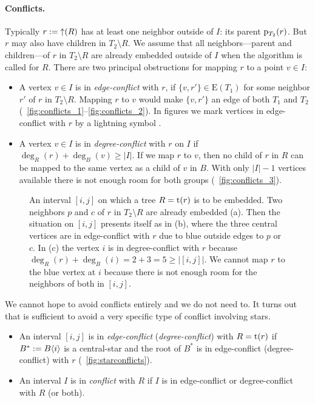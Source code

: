 \documentclass[11pt,a4paper,colorlinks=true,urlcolor=blue,citecolor=red]{article}
\theoremstyle{plain}
\newcommand{\subsubparagraph}[1]{\paragraph{#1}}
\begin{document}
\subsubparagraph{Conflicts.} Typically $r:=\mathop{\uparrow}(R)$ has at least one
neighbor outside of $I$: its parent $\mathrm p_{T_2}(r)$. But $r$ may also have
children in $T_2\setminus R$. We assume that all neighbors---parent and
children---of $r$ in $T_2\setminus R$ are already embedded outside of
$I$ when the algorithm is called for $R$. There are two principal
obstructions for mapping $r$ to a point $v\in I$:
\begin{itemize}
\item A vertex $v\in I$ is in \emph{edge-conflict} with $r$, if
  $\{v,r'\}\in\mathrm{E}(T_1)$ for some neighbor $r'$ of $r$ in
  $T_2\setminus R$. Mapping $r$ to $v$ would make $\{v,r'\}$ an edge of
  both $T_1$ and $T_2$
  (\figurename~\ref{fig:conflicts_1}--\ref{fig:conflicts_2}). In figures
  we mark vertices in edge-conflict with $r$ by a lightning symbol
  \Lightning.
\item A vertex $v\in I$ is in \emph{degree-conflict} with $r$ on $I$ if
  $\deg_R(r)+\deg_B(v)\ge|I|$. If we map $r$ to $v$, then no child of
  $r$ in $R$ can be mapped to the same vertex as a child of $v$ in
  $B$. With only $|I|-1$ vertices available there is not enough room for
  both groups (\figurename~\ref{fig:conflicts_3}).
\end{itemize}
\begin{figure}[htbp]
  \centering {}\hfil
  \hfil
  \hfil
  \caption{An interval $[i,j]$ on which a tree $R=\mathrm t(r)$ is to be
    embedded. Two neighbors $p$ and $c$ of $r$ in $T_2\setminus R$ are
    already embedded (a). Then the situation on $[i,j]$ presents itself
    as in (b), where the three central vertices are in edge-conflict
    with $r$ due to blue outside edges to $p$ or $c$.  In (c) the vertex
    $i$ is in degree-conflict with $r$ because
    $\deg_R(r)+\deg_B(i)=2+3=5\ge|[i,j]|$. We cannot map $r$ to the blue
    vertex at $i$ because there is not enough room for the neighbors of
    both in $[i,j]$.\label{fig:conflicts}}
\end{figure}

We cannot hope to avoid conflicts entirely and we do not need to. It
turns out that is sufficient to avoid a very specific type of conflict
involving stars.
\begin{itemize}
\item An interval $[i,j]$ is in \emph{edge-conflict}
  (\emph{degree-conflict}) with $R=\mathrm t(r)$ if $B^*:=B\langle{i}\rangle$ is a
  central-star and the root of $B^*$ is in edge-conflict
  (degree-conflict) with $r$ (\figurename~\ref{fig:starconflicts}).
\item An interval $I$ is in \emph{conflict} with $R$ if $I$ is in
  edge-conflict or degree-conflict with $R$ (or both).
\end{itemize}
\end{document}
